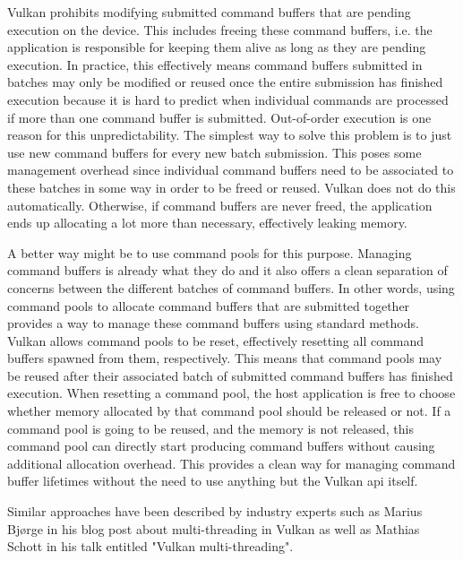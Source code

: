         Vulkan prohibits modifying submitted command buffers that are pending execution on the device.
        This includes freeing these command buffers, i.e. the application is responsible for keeping them alive as long as they are pending execution.
        In practice, this effectively means command buffers submitted in batches may only be modified or reused once the entire submission has finished execution because it is hard to predict when individual commands are processed if more than one command buffer is submitted.
        Out-of-order execution is one reason for this unpredictability.
        The simplest way to solve this problem is to just use new command buffers for every new batch submission.
        This poses some management overhead since individual command buffers need to be associated to these batches in some way in order to be freed or reused.
        Vulkan does not do this automatically.
        Otherwise, if command buffers are never freed, the application ends up allocating a lot more than necessary, effectively leaking memory.

        A better way might be to use command pools for this purpose.
        Managing command buffers is already what they do and it also offers a clean separation of concerns between the different batches of command buffers.
        In other words, using command pools to allocate command buffers that are submitted together provides a way to manage these command buffers using standard methods.
        Vulkan allows command pools to be reset, effectively resetting all command buffers spawned from them, respectively.
        This means that command pools may be reused after their associated batch of submitted command buffers has finished execution.
        When resetting a command pool, the host application is free to choose whether memory allocated by that command pool should be released or not.
        If a command pool is going to be reused, and the memory is not released, this command pool can directly start producing command buffers without causing additional allocation overhead.
        This provides a clean way for managing command buffer lifetimes without the need to use anything but the Vulkan \gls{api} itself.

        Similar approaches have been described by industry experts such as Marius Bjørge\cite{bjorge:multithreadingvulkan} in his blog post about multi-threading in Vulkan as well as Mathias Schott\cite{mschott:vulkan_multi_threading} in his talk entitled "Vulkan multi-threading".

